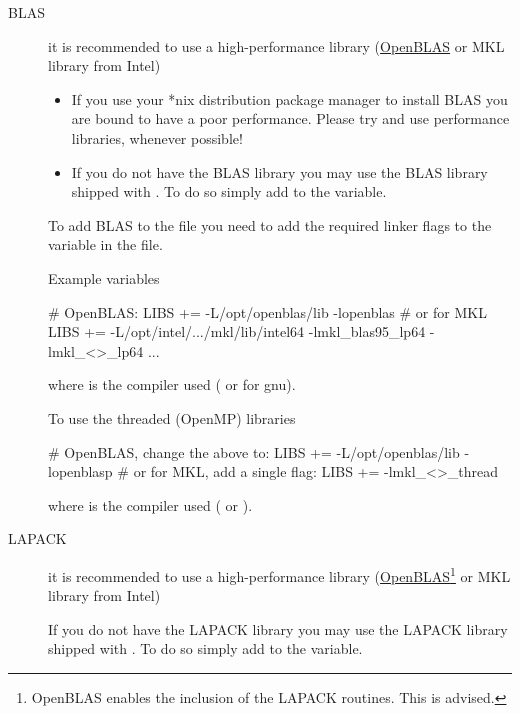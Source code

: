 \begin{description}

  \item[BLAS] %
  it is recommended to use a high-performance library
  (\href{https://github.com/xianyi/OpenBLAS}{OpenBLAS} or MKL
  library from Intel)
  
  \begin{itemize}
    \item If you use your *nix distribution package manager to install
    BLAS you are bound to have a poor performance. Please try and use
    performance libraries, whenever possible!

    \item If you do not have the BLAS library you may use the BLAS
    library shipped with \siesta. To do so simply add
     to the  variable.
  \end{itemize}

  To add BLAS to the  file you need to add the
  required linker flags to the  variable in the
   file.

  Example variables
\begin{shellexample}
  # OpenBLAS:
  LIBS += -L/opt/openblas/lib -lopenblas
  # or for MKL
  LIBS += -L/opt/intel/.../mkl/lib/intel64 -lmkl_blas95_lp64
  -lmkl_<>_lp64 ...
\end{shellexample}
  where \shell{<>} is the compiler used ( or 
  for gnu).

  To use the threaded (OpenMP) libraries
\begin{shellexample}
  # OpenBLAS, change the above to:
  LIBS += -L/opt/openblas/lib -lopenblasp
  # or for MKL, add a single flag:
  LIBS += -lmkl_<>_thread
\end{shellexample}
  where \shell{<>} is the compiler used ( or ).

  \item[LAPACK]%
  it is recommended to use a high-performance library
  (\href{https://github.com/xianyi/OpenBLAS}{OpenBLAS}\footnote{OpenBLAS
      enables the inclusion of the LAPACK routines. This is advised.}
  or MKL library from Intel)

  If you do not have the LAPACK library you may use the LAPACK
  library shipped with \siesta. To do so simply add
   to the  variable.


\end{description}
